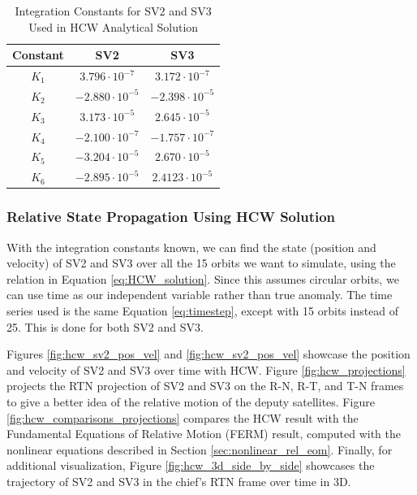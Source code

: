 \begin{table}[ht]
    \centering
    \renewcommand{\arraystretch}{1.2}
    \begin{tabular}{c c c}
        \toprule
        \textbf{Constant} & \textbf{SV2} & \textbf{SV3} \\
        \midrule
        $K_1$ & $3.796\cdot10^{-7}$ & $3.172\cdot10^{-7}$ \\
        $K_2$ & $-2.880\cdot10^{-5}$ & $-2.398\cdot10^{-5}$ \\
        $K_3$ & $3.173\cdot10^{-5}$& $2.645\cdot10^{-5}$\\
        $K_4$ & $-2.100\cdot10^{-7}$ & $-1.757\cdot10^{-7}$ \\
        $K_5$ & $-3.204\cdot10^{-5}$ & $2.670\cdot10^{-5}$ \\
        $K_6$ & $-2.895\cdot10^{-5}$ & $2.4123\cdot10^{-5}$ \\
        \bottomrule
    \end{tabular}
    \caption{Integration Constants for SV2 and SV3 Used in HCW Analytical Solution}
    \label{tab:integration_constants_HCW}
\end{table}

\subsubsection{Relative State Propagation Using HCW Solution}

With the integration constants known, we can find the state (position and velocity) of SV2 and SV3 over all the 15 orbits we want to simulate, using the relation in Equation \ref{eq:HCW_solution}. Since this assumes circular orbits, we can use time as our independent variable rather than true anomaly. The time series used is the same Equation \ref{eq:timestep}, except with 15 orbits instead of 25. This is done for both SV2 and SV3.

Figures \ref{fig:hcw_sv2_pos_vel} and \ref{fig:hcw_sv2_pos_vel} showcase the position and velocity of SV2 and SV3 over time with HCW. Figure \ref{fig:hcw_projections} projects the RTN projection of SV2 and SV3 on the R-N, R-T, and T-N frames to give a better idea of the relative motion of the deputy satellites. Figure \ref{fig:hcw_comparisons_projections} compares the HCW result with the Fundamental Equations of Relative Motion (FERM) result, computed with the nonlinear equations described in Section \ref{sec:nonlinear_rel_eom}. Finally, for additional visualization, Figure \ref{fig:hcw_3d_side_by_side} showcases the trajectory of SV2 and SV3 in the chief's RTN frame over time in 3D.


